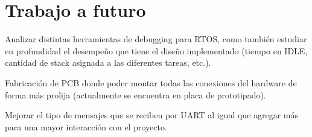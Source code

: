 \documentclass{IEEEtran}
\begin{document}
\section{Trabajo a futuro}
Analizar distintas herramientas de debugging para RTOS, como también estudiar en profundidad el desempeño que tiene el diseño implementado (tiempo en IDLE, cantidad de stack asignada a las diferentes tareas, etc.).

Fabricación de PCB donde poder montar todas las conexiones del hardware de forma más prolija (actualmente se encuentra en placa de prototipado).

Mejorar el tipo de mensajes que se reciben por UART al igual que agregar más para una mayor interacción con el proyecto.

\printbibliography
\end{document}
